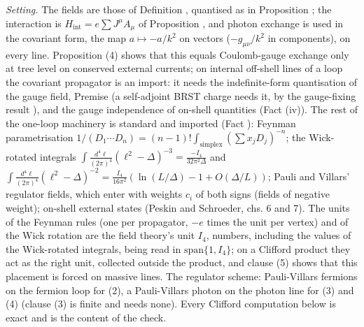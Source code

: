 \emph{Setting.} The fields are those of Definition , quantised as in Proposition ; the interaction is $H_{\mathrm{int}} = e\sum J^{\mu}A_{\mu}$ of Proposition , and photon exchange is used in the covariant form, the map $a \mapsto -a/k^{2}$ on vectors ($-g_{\mu\nu}/k^{2}$ in components), on every line. Proposition (4) shows that this equals Coulomb-gauge exchange only at tree level on conserved external currents; on internal off-shell lines of a loop the covariant propagator is an import: it needs the indefinite-form quantisation of the gauge field, Premise  (a self-adjoint BRST charge needs it, by the gauge-fixing result ), and the gauge independence of on-shell quantities (Fact (iv)). The rest of the one-loop machinery is standard and imported (Fact ): Feynman parametrisation $1/(D_{1}\cdots D_{n}) = (n-1)!\int_{\mathrm{simplex}}(\sum x_{j}D_{j})^{-n}$; the Wick-rotated integrals $\int\frac{d^{4}\ell}{(2\pi)^{4}}(\ell^{2}-\Delta)^{-3} = \frac{-I_{4}}{32\pi^{2}\Delta}$ and $\int\frac{d^{4}\ell}{(2\pi)^{4}}(\ell^{2}-\Delta)^{-2} = \frac{I_{4}}{16\pi^{2}}(\ln(L/\Delta) - 1 + O(\Delta/L))$; Pauli and Villars' regulator fields, which enter with weights $c_{i}$ of both signs (fields of negative weight); on-shell external states (Peskin and Schroeder, chs. 6 and 7). The units of the Feynman rules (one per propagator, $-e$ times the unit per vertex) and of the Wick rotation are the field theory's unit $I_{4}$, numbers, including the values of the Wick-rotated integrals, being read in $\mathrm{span}\{1, I_{4}\}$; on a Clifford product they act as the right unit, collected outside the product, and clause (5) shows that this placement is forced on massive lines. The regulator scheme: Pauli-Villars fermions on the fermion loop for (2), a Pauli-Villars photon on the photon line for (3) and (4) (clause (3) is finite and needs none). Every Clifford computation below is exact and is the content of the check.


